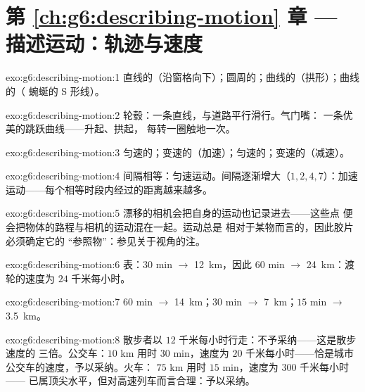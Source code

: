 \section*{第 \ref{ch:g6:describing-motion} 章 --- 描述运动：轨迹与速度}

\begin{solution}{exo:g6:describing-motion:1}
直线的（沿窗格向下）；圆周的；曲线的（拱形）；曲线的（
蜿蜒的 S 形线）。
\end{solution}

\begin{solution}{exo:g6:describing-motion:2}
轮毂：一条直线，与道路平行滑行。气门嘴：
一条优美的跳跃曲线——升起、拱起，
每转一圈触地一次。
\end{solution}

\begin{solution}{exo:g6:describing-motion:3}
匀速的；变速的（加速）；匀速的；变速的（减速）。
\end{solution}

\begin{solution}{exo:g6:describing-motion:4}
间隔相等：匀速运动。间隔逐渐增大（$1, 2, 4, 7$）：加速
运动——每个相等时段内经过的距离越来越多。
\end{solution}

\begin{solution}{exo:g6:describing-motion:5}
漂移的相机会把自身的运动也记录进去——这些点
便会把物体的路程与相机的运动混在一起。运动总是
相对于某物而言的，因此胶片必须确定它的
“参照物”：参见关于视角的注。
\end{solution}

\begin{solution}{exo:g6:describing-motion:6}
表：$30$ min $\to$ \qty{12}{km}，因此 $60$ min $\to$
\qty{24}{km}：渡轮的速度为 $24$ 千米每小时。
\end{solution}

\begin{solution}{exo:g6:describing-motion:7}
$60$ min $\to$ \qty{14}{km}；$30$ min $\to$ \qty{7}{km}；$15$ min
$\to$ \qty{3.5}{km}。
\end{solution}

\begin{solution}{exo:g6:describing-motion:8}
散步者以 $12$ 千米每小时行走：不予采纳——这是散步速度的
三倍。公交车：$10$ km 用时 $30$ min，速度为 $20$
千米每小时——恰是城市公交车的速度，予以采纳。火车：
$75$ km 用时 $15$ min，速度为 $300$ 千米每小时——
已属顶尖水平，但对高速列车而言合理：予以采纳。
\end{solution}

